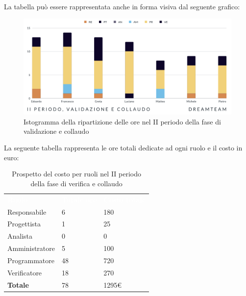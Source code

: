 La tabella può essere rappresentata anche in forma visiva dal seguente grafico:
\begin{figure}[H]
\centering
\includegraphics[scale=0.65]{Sezioni/SezioniPreventivo/grafici/Validazione_collaudo_II_periodo.png}
\caption{Istogramma della ripartizione delle ore nel II periodo della fase di validazione e collaudo}
\end{figure}

La seguente tabella rappresenta le ore totali dedicate ad ogni ruolo e il costo in euro:

\begin{table}[H]
\begin{center}
\renewcommand{\arraystretch}{1.5}
\begin{tabular}{ m{}<{\centering}  m{}<{\centering} m{}<{\centering}}
	\rowcolor{darkblue}
	\textcolor{white}{\textbf{Ruolo}}&\textcolor{white}{\textbf{Totale ore}}&\textcolor{white}{\textbf{Costo totale}}\\ 

	Responsabile  & 6 & 180 \\	
	
	Progettista & 1 & 25 \\
	
	Analista & 0 & 0 \\

	Amministratore & 5 & 100 \\
	
	Programmatore & 48 & 720 \\
	
	Verificatore & 18 & 270 \\
	
	\textbf{Totale} & 78 & 1295\euro \\
	
\end{tabular}
\caption{Prospetto del costo per ruoli nel II periodo della fase di verifica e collaudo}
\end{center}
\end{table}

